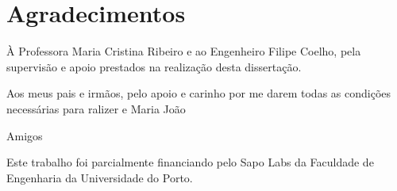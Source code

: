 \chapter*{Agradecimentos}
À Professora Maria Cristina Ribeiro e ao Engenheiro Filipe Coelho, pela supervisão e apoio prestados na realização desta dissertação.

Aos meus pais e irmãos, pelo apoio e carinho por me darem todas as condições necessárias para ralizer e Maria João

Amigos

Este trabalho foi parcialmente financiando pelo Sapo Labs da Faculdade de Engenharia da Universidade do Porto.
\vspace{10mm}
